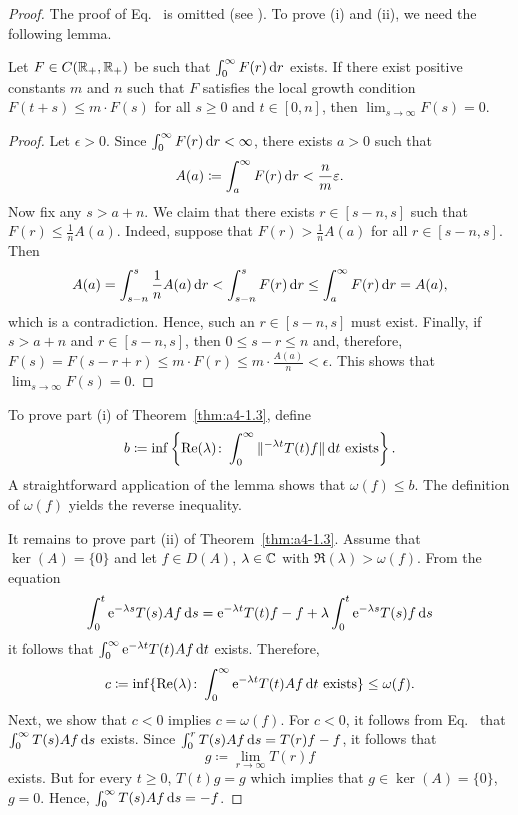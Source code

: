 \begin{proof}  The proof of Eq.~ is omitted (see \textcite[p.306]{hillephillips:1957}). 
To prove (i) and (ii), we need the following lemma.
\begin{lemma*}\label{lem:a4-1.3}
Let $F \in C(\mathbb{R}_{+},\mathbb{R}_{+})$ be such that $\int_{0}^{\infty} F(r) \mathop{}\!\mathrm{d}{r}$ exists. 
If there exist positive constants $m$ and $n$ such that $F$ satisfies the local growth condition $F(t + s) \leq m \cdot F(s)$ for all $s \geq 0$ and $t \in \left[0,n\right]$, then $\lim_{s \to \infty} F(s) = 0$.
\end{lemma*}
\begin{proof}
Let $\epsilon > 0$. Since $\int_0^\infty F(r) \mathop{}\!\mathrm{d}{r} < \infty$, there exists $a > 0$ such that
\[
A(a) \coloneq \int_{a}^{\infty} F(r) \dr < \frac{n}{m}\epsilon.
\]
Now fix any $s > a + n$. We claim that there exists $r \in [s - n, s]$ such that
\(
F(r) \leq \frac{1}{n}A(a).
\)
Indeed, suppose that $F(r) > \frac{1}{n}A(a)$ for all $r \in [s - n, s]$. Then
\[ 
A(a) = \int_{s-n}^{s}\frac{1}{n}A(a)\dr < \int_{s-n}^{s}F(r)\dr  \leq \int_a^\infty F(r)\dr = A(a) , 
\]
which is a contradiction.
Hence, such an $r \in [s - n, s]$ must exist.
Finally, if\/ $s>a+n$ and $r\in [s-n,s]$, then $0 \leq s-r \leq n$ and, therefore, $F(s) = F(s-r+r) \leq m \cdot F(r) \leq m \cdot \frac{A(a)}{n} < \epsilon$. 
This shows that $\lim_{s \to \infty} F(s) = 0$.
\end{proof}
To prove part (i) of Theorem~\ref{thm:a4-1.3}, define 
%
\[
	b \coloneq \inf \left\{\mathop{}\!\mathrm{Re}(\lambda)\colon\int_{0}^{\infty} \|^{-\lambda t} T(t)f\|  \mathop{}\!\mathrm{d}{t} \text{ exists} \right\}.
\]
%
A straightforward application of the lemma shows that $\omega(f) \leq b$.
The definition of\/ $\omega(f)$ yields the reverse inequality.

It remains to prove part (ii) of Theorem~\ref{thm:a4-1.3}.
Assume that $\ker(A) = \{0\}$ and let $f \in D(A)$, $\lambda \in \mathbb{C}$ with $\Re(\lambda) > \omega(f)$. 
From the equation
\[
\int_{0}^{t} \mathrm{e}^{-\lambda s} T(s)Af  \mathop{}\!\mathrm{d}{s} = \mathrm{e}^{-\lambda t}T(t)f - f + \lambda \int_{0}^{t} \mathrm{e}^{-\lambda s} T(s)f  \mathop{}\!\mathrm{d}{s}
\]
it follows that $\int_{0}^{\infty} \mathrm{e}^{-\lambda t} T(t)Af  \mathop{}\!\mathrm{d}{t}$ exists. 
Therefore, 
\[ 
c \coloneq \inf\{\Re(\lambda)\colon\int_{0}^{\infty} \eu^{-\lambda t}T(t)Af  \dt \text{ exists}\} \leq \omega(f) .
\]
Next, we show that $c < 0$ implies $c = \omega(f)$. 
For $c < 0$, it follows from Eq.~ that $\int_{0}^{\infty} T(s)Af  \mathop{}\!\mathrm{d}{s}$ exists. 
Since $\int_{0}^{r} T(s)Af  \mathop{}\!\mathrm{d}{s} = T(r)f - f$, it follows that \[g \coloneqq\lim_{r \to \infty} T(r)f\] exists. 
But for every $t \geq 0$, $T(t)g = g$ which implies that $g \in \ker(A) = \{0\}$, \ie $g = 0$. 
Hence, $\int_{0}^{\infty} T(s)Af  \mathop{}\!\mathrm{d}{s} = -f$.


\end{proof}
